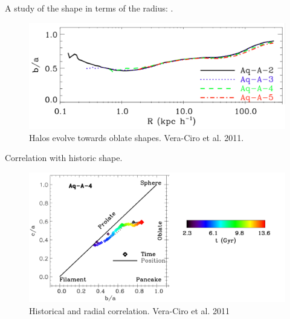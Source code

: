 \documentclass[xcolor=dvipsnames]{beamer}
\begin{document}
\begin{frame}
\centering
A study of the shape in terms of the radius: \cite[Vera-Ciro et al. 2011]{Vera-Ciro2011}.

\begin{figure}[c]
\includegraphics[width=1\linewidth]{./pics/shapeRadius.png}
\caption{ \tiny Halos evolve towards oblate shapes.  Vera-Ciro et al. 2011.}
\end{figure}

\end{frame}


\begin{frame}
\centering
Correlation with historic shape.

\begin{figure}
\includegraphics[width=1\linewidth]{./pics/shapeHistory.png}
\caption{\tiny Historical and radial correlation. Vera-Ciro et al. 2011}
\end{figure}

\end{frame}
\end{document}
